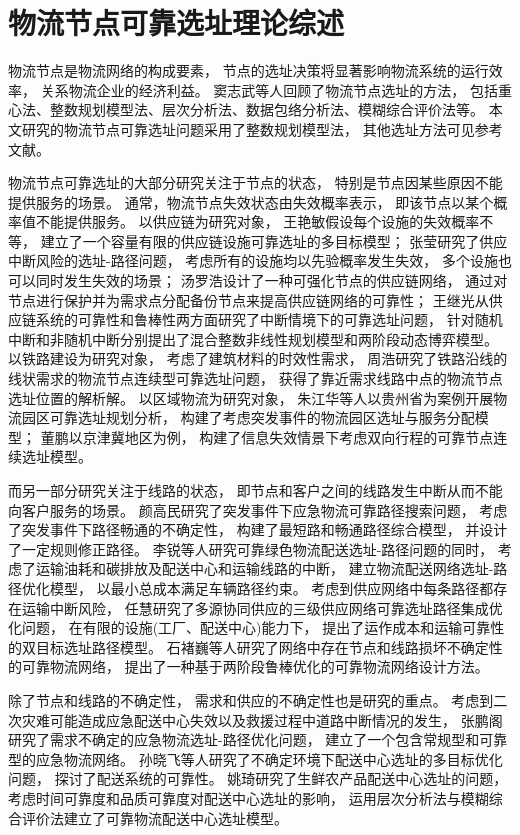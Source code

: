 \section{物流节点可靠选址理论综述}
\label{section:节点选址概述}

物流节点是物流网络的构成要素，
节点的选址决策将显著影响物流系统的运行效率，
关系物流企业的经济利益。
窦志武等人\cite{窦志武}回顾了物流节点选址的方法，
包括重心法、整数规划模型法、层次分析法、数据包络分析法、模糊综合评价法等。
本文研究的物流节点可靠选址问题采用了整数规划模型法，
其他选址方法可见参考文献\cite{层次分析,重心法,数据包络分析}。

物流节点可靠选址的大部分研究关注于节点的状态，
特别是节点因某些原因不能提供服务的场景。
通常，物流节点失效状态由失效概率表示，
即该节点以某个概率值不能提供服务。
以供应链为研究对象，
王艳敏\cite{王艳敏}假设每个设施的失效概率不等，
建立了一个容量有限的供应链设施可靠选址的多目标模型；
张莹\cite{张莹}研究了供应中断风险的选址-路径问题，
考虑所有的设施均以先验概率发生失效，
多个设施也可以同时发生失效的场景；
汤罗浩\cite{汤罗浩}设计了一种可强化节点的供应链网络，
通过对节点进行保护并为需求点分配备份节点来提高供应链网络的可靠性；
王继光\cite{王继光}从供应链系统的可靠性和鲁棒性两方面研究了中断情境下的可靠选址问题，
针对随机中断和非随机中断分别提出了混合整数非线性规划模型和两阶段动态博弈模型。
以铁路建设为研究对象，
考虑了建筑材料的时效性需求，
周浩\cite{周浩}研究了铁路沿线的线状需求的物流节点连续型可靠选址问题，
获得了靠近需求线路中点的物流节点选址位置的解析解。
以区域物流为研究对象，
朱江华等人\cite{朱江华}以贵州省为案例开展物流园区可靠选址规划分析，
构建了考虑突发事件的物流园区选址与服务分配模型；
董鹏\cite{董鹏}以京津冀地区为例，
构建了信息失效情景下考虑双向行程的可靠节点连续选址模型。

而另一部分研究关注于线路的状态，
即节点和客户之间的线路发生中断从而不能向客户服务的场景。
颜高民\cite{颜高民}研究了突发事件下应急物流可靠路径搜索问题，
考虑了突发事件下路径畅通的不确定性，
构建了最短路和畅通路径综合模型，
并设计了一定规则修正路径。
李锐等人\cite{李锐}研究可靠绿色物流配送选址-路径问题的同时，
考虑了运输油耗和碳排放及配送中心和运输线路的中断，
建立物流配送网络选址-路径优化模型，
以最小总成本满足车辆路径约束。
考虑到供应网络中每条路径都存在运输中断风险，
任慧\cite{任慧}研究了多源协同供应的三级供应网络可靠选址路径集成优化问题，
在有限的设施(工厂、配送中心)能力下，
提出了运作成本和运输可靠性的双目标选址路径模型。
石褚巍等人\cite{石褚巍}研究了网络中存在节点和线路损坏不确定性的可靠物流网络，
提出了一种基于两阶段鲁棒优化的可靠物流网络设计方法。

除了节点和线路的不确定性，
需求和供应的不确定性也是研究的重点。
考虑到二次灾难可能造成应急配送中心失效以及救援过程中道路中断情况的发生，
张鹏阁\cite{张鹏阁}研究了需求不确定的应急物流选址-路径优化问题，
建立了一个包含常规型和可靠型的应急物流网络。
孙晓飞等人\cite{孙晓飞}研究了不确定环境下配送中心选址的多目标优化问题，
探讨了配送系统的可靠性。
姚琦\cite{姚琦}研究了生鲜农产品配送中心选址的问题，
考虑时间可靠度和品质可靠度对配送中心选址的影响，
运用层次分析法与模糊综合评价法建立了可靠物流配送中心选址模型。


